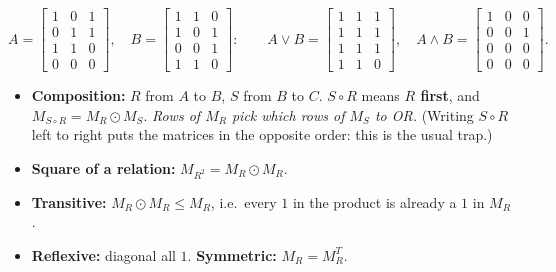 \documentclass{fkt-notes}
\theoremstyle{definition}
\begin{document}
\begin{example}
  \[
    A=\begin{bmatrix}1&0&1\\0&1&1\\1&1&0\\0&0&0\end{bmatrix},\quad
    B=\begin{bmatrix}1&1&0\\1&0&1\\0&0&1\\1&1&0\end{bmatrix}:\qquad
    A\vee B=\begin{bmatrix}1&1&1\\1&1&1\\1&1&1\\1&1&0\end{bmatrix},\quad
    A\wedge B=\begin{bmatrix}1&0&0\\0&0&1\\0&0&0\\0&0&0\end{bmatrix}.
  \]
\end{example}

\begin{rulebox}[title={Where Boolean products appear in relations}]
  \begin{itemize}[nosep]
    \item \textbf{Composition:} $R$ from $A$ to $B$, $S$ from $B$ to $C$.
          $S\circ R$ means \textbf{$R$ first}, and
          $M_{S\circ R}=M_R\odot M_S$. \emph{Rows of $M_R$ pick which rows
          of $M_S$ to OR.} (Writing $S\circ R$ left to right puts the
          matrices in the opposite order: this is the usual trap.)
    \item \textbf{Square of a relation:} $M_{R^2}=M_R\odot M_R$.
    \item \textbf{Transitive:} $M_R\odot M_R\le M_R$, i.e.\ every $1$ in
          the product is already a $1$ in $M_R$.
    \item \textbf{Reflexive:} diagonal all $1$. \textbf{Symmetric:}
          $M_R=M_R^{T}$.
  \end{itemize}
\end{rulebox}
\end{document}
